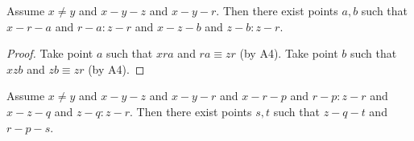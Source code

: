 \documentclass[10pt,a4paper,parskip=half,numbers=endperiod,headings=standardclasses,parskip]{scrartcl}
\newcommand{\Cong}[4]{#1 #2 \equiv #3 #4}
\newcommand{\Betw}[3]{#1 #2 #3}
\newcommand{\bprime}{b'}
\newcommand{\bdoubleprime}{b''}
\newcommand{\fresha}{a}
\newcommand{\freshb}{b}
\begin{document}
  \begin{forthel}
    \begin{lemma} %
      Assume $x \neq y$ and $x-y-z$ and $x-y-r$.
      Then there exist points $\fresha,\freshb$ such that $x-r-\fresha$ and $r-\fresha : z-r$ and $x-z-\freshb$ and $z-\freshb : z-r$.
    \end{lemma}
    \begin{proof}
      Take point $a$ such that $\Betw{x}{r}{a}$ and $\Cong{r}{a}{z}{r}$ (by A4).
      Take point $b$ such that $\Betw{x}{z}{b}$ and $\Cong{z}{b}{z}{r}$ (by A4).
    \end{proof}



    \begin{lemma} %
      Assume $x \neq y$ and $x-y-z$ and $x-y-r$ and $x-r-p$ and $r-p : z-r$ and
      $x-z-q$ and $z-q : z-r$. Then there exist points $s,t$ such that $z-q-t$ and $r-p-s$.
    \end{lemma}

  \end{forthel}

\end{document}
